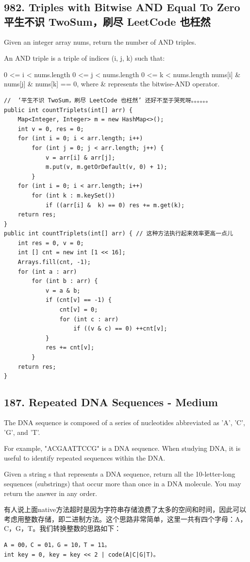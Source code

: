 \documentclass[9pt, b5paper]{article}
\begin{document}
\subsection{982. Triples with Bitwise AND Equal To Zero 平生不识 TwoSum，刷尽 LeetCode 也枉然}
\label{sec-2-6}
Given an integer array nums, return the number of AND triples.

An AND triple is a triple of indices (i, j, k) such that:

0 <= i < nums.length
0 <= j < nums.length
0 <= k < nums.length
nums[i] \& nums[j] \& nums[k] == 0, where \& represents the bitwise-AND operator.
\begin{verbatim}
//  ‘平生不识 TwoSum，刷尽 LeetCode 也枉然’ 还好不至于哭死呀。。。。。。
public int countTriplets(int[] arr) { 
    Map<Integer, Integer> m = new HashMap<>();
    int v = 0, res = 0;
    for (int i = 0; i < arr.length; i++) 
        for (int j = 0; j < arr.length; j++) {
            v = arr[i] & arr[j];
            m.put(v, m.getOrDefault(v, 0) + 1);
        }
    for (int i = 0; i < arr.length; i++) 
        for (int k : m.keySet()) 
            if ((arr[i] &  k) == 0) res += m.get(k);
    return res;
}
public int countTriplets(int[] arr) { // 这种方法执行起来效率更高一点儿
    int res = 0, v = 0;
    int [] cnt = new int [1 << 16];
    Arrays.fill(cnt, -1);
    for (int a : arr) 
        for (int b : arr) {
            v = a & b;
            if (cnt[v] == -1) {
                cnt[v] = 0;
                for (int c : arr) 
                    if ((v & c) == 0) ++cnt[v];
            }
            res += cnt[v];
        }
    return res;
}
\end{verbatim}

\subsection{187. Repeated DNA Sequences - Medium}
\label{sec-2-7}
The DNA sequence is composed of a series of nucleotides abbreviated as 'A', 'C', 'G', and 'T'.

For example, "ACGAATTCCG" is a DNA sequence.
When studying DNA, it is useful to identify repeated sequences within the DNA.

Given a string s that represents a DNA sequence, return all the 10-letter-long sequences (substrings) that occur more than once in a DNA molecule. You may return the answer in any order.

有人说上面native方法超时是因为字符串存储浪费了太多的空间和时间，因此可以考虑用整数存储，即二进制方法。这个思路非常简单，这里一共有四个字母：A，C，G，T。我们转换整数的思路如下：
\begin{verbatim}
A = 00，C = 01，G = 10，T = 11。
int key = 0, key = key << 2 | code(A|C|G|T)。
\end{verbatim}
\end{document}
